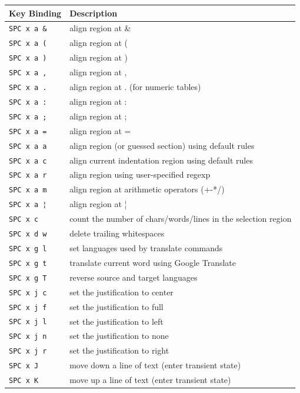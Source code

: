 \documentclass[11pt]{article}
\begin{document}
\begin{center}
\begin{tabular}{ll}
Key Binding & Description\\
\hline
\texttt{SPC x a \&} & align region at \&\\
\texttt{SPC x a (} & align region at (\\
\texttt{SPC x a )} & align region at )\\
\texttt{SPC x a ​,​} & align region at ,\\
\texttt{SPC x a .} & align region at . (for numeric tables)\\
\texttt{SPC x a :} & align region at :\\
\texttt{SPC x a ;} & align region at ;\\
\texttt{SPC x a =} & align region at =\\
\texttt{SPC x a a} & align region (or guessed section) using default rules\\
\texttt{SPC x a c} & align current indentation region using default rules\\
\texttt{SPC x a r} & align region using user-specified regexp\\
\texttt{SPC x a m} & align region at arithmetic operators (+-*/)\\
\texttt{SPC x a ¦} & align region at ¦\\
\texttt{SPC x c} & count the number of chars/words/lines in the selection region\\
\texttt{SPC x d w} & delete trailing whitespaces\\
\texttt{SPC x g l} & set languages used by translate commands\\
\texttt{SPC x g t} & translate current word using Google Translate\\
\texttt{SPC x g T} & reverse source and target languages\\
\texttt{SPC x j c} & set the justification to center\\
\texttt{SPC x j f} & set the justification to full\\
\texttt{SPC x j l} & set the justification to left\\
\texttt{SPC x j n} & set the justification to none\\
\texttt{SPC x j r} & set the justification to right\\
\texttt{SPC x J} & move down a line of text (enter transient state)\\
\texttt{SPC x K} & move up a line of text (enter transient state)\\

\end{tabular}
\end{center}
\end{document}
